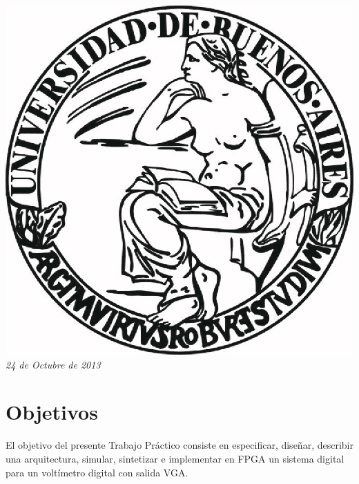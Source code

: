 \documentclass{article}
\begin{document}
\begin{titlepage}
\includegraphics[scale=0.5]{UBA.jpg}\\[1cm] %


{\large \text \em {24 de Octubre de 2013}}\\[3cm] %
 

\vfill %

\end{titlepage}

\tableofcontents
		
\newpage

\section{Objetivos}

El objetivo del presente Trabajo Práctico consiste en especificar, diseñar, describir una arquitectura, simular, sintetizar e implementar en FPGA un sistema digital para un voltímetro digital con salida VGA.
\end{document}
